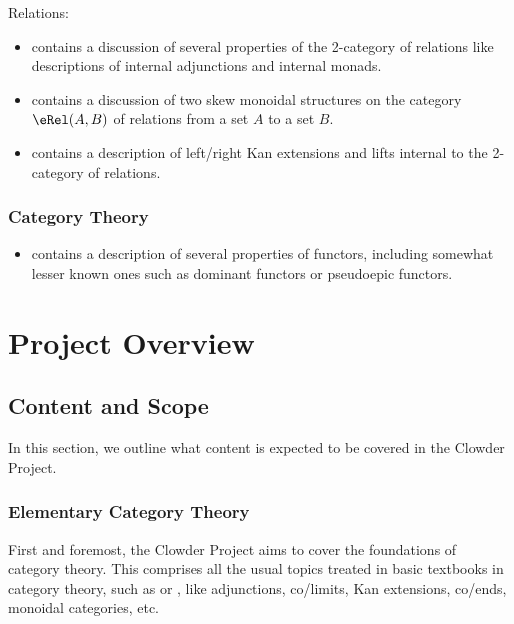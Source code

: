 Relations:
\begin{itemize}
    \item {} contains a discussion of several properties of the 2-category of relations like descriptions of internal adjunctions and internal monads.
    \item {} contains a discussion of two skew monoidal structures on the category $\eRel(A,B)$ of relations from a set $A$ to a set $B$.
    \item {} contains a description of left/right Kan extensions and lifts internal to the 2-category of relations.
\end{itemize}
\subsubsection{Category Theory}\label{subsubsection-goodies-category-theory}
\begin{itemize}
    \item \ChapterCategories contains a description of several properties of functors, including somewhat lesser known ones such as dominant functors or pseudoepic functors.
\end{itemize}
\section{Project Overview}\label{section-project-overview}
\subsection{Content and Scope}\label{subsection-content-and-scope}
In this section, we outline what content is expected to be covered in the Clowder Project.
\subsubsection{Elementary Category Theory}\label{subsubsection-elementary-category-theory}
First and foremost, the Clowder Project aims to cover the foundations of category theory. This comprises all the usual topics treated in basic textbooks in category theory, such as \cite{categories-for-the-working-mathematician} or \cite{category-theory-in-context}, like adjunctions, co/limits, Kan extensions, co/ends, monoidal categories, etc.
